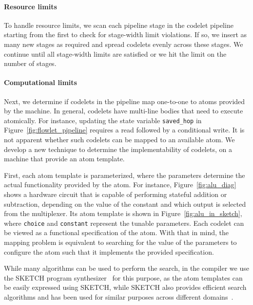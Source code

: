 \paragraph{Resource limits}
To handle resource limits, we scan each pipeline stage in the codelet pipeline
starting from the first to check for stage-width limit violations.  If so, we
insert as many new stages as required and spread codelets evenly across these
stages.  We continue until all stage-width limits are satisfied or we
hit the limit on the number of stages.

\paragraph{Computational limits}
Next, we determine if codelets in the pipeline map one-to-one to atoms provided
by the \absmachine machine. In general, codelets have multi-line bodies that
need to execute atomically. For instance, updating the state variable
\texttt{saved\_hop} in Figure~\ref{fig:flowlet_pipeline} requires a read
followed by a conditional write.  It is not apparent whether such codelets can
be mapped to an available atom. We develop a new technique to determine the
implementability of codelets, on a \absmachine machine that provide an atom
template.

First, each atom template is parameterized, where the parameters determine the
actual functionality provided by the atom.  For instance,
Figure~\ref{fig:alu_diag} shows a hardware circuit that is capable of
performing stateful addition or subtraction, depending on the value of the
constant and which output is selected from the multiplexer.  Its atom template
 is shown in Figure~\ref{fig:alu_in_sketch}, where {\tt choice}
and {\tt constant} represent the tunable parameters.  Each codelet can be
viewed as a functional specification of the atom.  With that in mind, the
mapping problem is equivalent to searching for the value of the parameters to
configure the atom such that it implements the provided specification.

While many algorithms can be used to perform the search, in the \pktlanguage
compiler we use the SKETCH program synthesizer~\cite{sketch_asplos} for this
purpose, as the atom templates can be easily expressed using SKETCH, while
SKETCH also provides efficient search algorithms and has been used for similar
purposes across different domains~\cite{bitstreaming, lifejoin, qbs, chlorophyll}.


